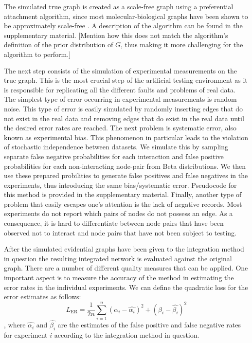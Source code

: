 \documentclass{bioinfo}
\newcommand{\note}[1]{{\color{red}[#1]}}
\begin{document}
\begin{methods}
The simulated true graph is created as a scale-free graph using a preferential attachment algorithm, since most molecular-biological graphs have been shown to be approximately scale-free \citep{jeong_lethality_2001, eisenberg_preferential_2003}. A description of the algorithm can be found in the supplementary material.
\note{Mention how this does not match the algorithm's definition of the prior distribution of $G$, thus making it more challenging for the algorithm to perform.}%

The next step consists of the simulation of experimental measurements on the true graph. This is the most crucial step of the artificial testing environment as it is responsible for replicating all the different faults and problems of real data. The simplest type of error occurring in experimental measurements is random noise. This type of error is easily simulated by randomly inserting edges that do not exist in the real data and removing edges that do exist in the real data until the desired error rates are reached. The next problem is systematic error, also known as experimental bias. This phenomenon in particular leads to the violation of stochastic independence between datasets. We simulate this by sampling separate false negative probabilities for each interaction and false positive probabilities for each non-interacting node-pair from Beta distributions. We then use these prepared probilities to generate false positives and false negatives in the experiments, thus introducing the same bias/systematic error. Pseudocode for this method is provided in the supplementary material.
Finally, another type of problem that easily escapes one's attention is the lack of negative records. Most experiments do not report which pairs of nodes do not possess an edge. As a consequence, it is hard to differentiate between node pairs that have been observed not to interact and node pairs that have not been subject to testing. 

After the simulated evidential graphs have been given to the integration method in question the resulting integrated network is evaluated against the original graph. There are a number of different quality measures that can be applied. One important aspect is to measure the accuracy of the method in estimating the error rates in the individual experiments. We can define the quadratic loss for the error estimates as follows:
\begin{equation}
  L_\text{ER} = \frac{1}{2n}\sum_{i=1}^n (\alpha_i - \hat{\alpha_i})^2 + (\beta_i - \hat{\beta_i})^2
\end{equation},
where $\hat{\alpha_i}$ and $\hat{\beta_i}$ are the estimates of the false positive and false negative rates for experiment $i$ according to the integration method in question.


\end{methods}
\end{document}
